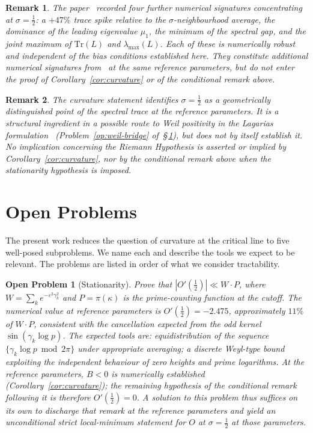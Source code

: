 \documentclass[11pt]{article}
\newtheorem*{remark}{Remark}
\newtheorem{openproblem}[theorem]{Open Problem}
\begin{document}
\begin{remark}
The paper~\cite{Paper5} recorded four further numerical signatures
concentrating at $\sigma=\tfrac12$: a $+47\%$ trace spike relative to
the $\sigma$-neighbourhood average, the dominance of the leading
eigenvalue $\mu_1$, the minimum of the spectral gap, and the joint
maximum of $\mathrm{Tr}(L)$ and $\lambda_{\max}(L)$.
Each of these is numerically robust and independent of the bias
conditions established here.
They constitute additional numerical signatures from~\cite{Paper5} at
the same reference parameters, but do not enter the proof of
Corollary~\ref{cor:curvature} or of the conditional remark above.
\end{remark}

\begin{remark}
The curvature statement identifies $\sigma=\tfrac12$ as a geometrically
distinguished point of the spectral trace at the reference parameters.
It is a structural ingredient in a possible route to Weil positivity
in the Lagarias formulation~\cite{Lagarias}
(Problem~\ref{op:weil-bridge} of~\S\,\ref{sec:open}), but does not by
itself establish it.
No implication concerning the Riemann Hypothesis is asserted or
implied by Corollary~\ref{cor:curvature}, nor by the conditional remark
above when the stationarity hypothesis is imposed.
\end{remark}

\section{Open Problems}
\label{sec:open}

The present work reduces the question of curvature at the critical
line to five well-posed subproblems.
We name each and describe the tools we expect to be relevant.
The problems are listed in order of what we consider tractability.

\begin{openproblem}[Stationarity]
\label{op:stat}
Prove that $|O'(\tfrac12)|\ll W\cdot P$, where
$W=\sum_k e^{-\varepsilon^2\gamma_k^2}$ and $P=\pi(\kappa)$ is the
prime-counting function at the cutoff.
The numerical value at reference parameters is $O'(\tfrac12)=-2.475$,
approximately $11\%$ of $W\cdot P$, consistent with the cancellation
expected from the odd kernel $\sin(\gamma_k\log p)$.
The expected tools are: equidistribution of the sequence
$\{\gamma_k\log p\bmod 2\pi\}$ under appropriate averaging; a discrete
Weyl-type bound exploiting the independent behaviour of zero heights
and prime logarithms.
At the reference parameters, $B<0$ is numerically established
(Corollary~\ref{cor:curvature}); the remaining hypothesis of the
conditional remark following it is therefore $O'(\tfrac12)=0$.
A solution to this problem thus suffices on its own to discharge that
remark at the reference parameters and yield an unconditional strict
local-minimum statement for $O$ at $\sigma=\tfrac12$ at those
parameters.
\end{openproblem}
\end{document}
